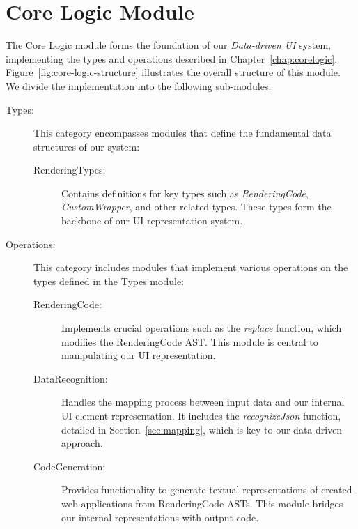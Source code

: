 \section{Core Logic Module}
The Core Logic module forms the foundation of our \emph{Data-driven UI} system, implementing the types and operations described in Chapter~\ref{chap:corelogic}.
Figure~\ref{fig:core-logic-structure} illustrates the overall structure of this module.
We divide the implementation into the following sub-modules:
\begin{description}
	\item[Types:] This category encompasses modules that define the fundamental data structures of our system:
	      \begin{description}
		      \item[RenderingTypes:] Contains definitions for key types such as \emph{RenderingCode}, \emph{CustomWrapper}, and other related types.
		            These types form the backbone of our UI representation system.
	      \end{description}

	\item[Operations:] This category includes modules that implement various operations on the types defined in the Types module:
	      \begin{description}
		      \item[RenderingCode:] Implements crucial operations such as the \emph{replace} function, which modifies the RenderingCode AST.
		            This module is central to manipulating our UI representation.

		      \item[DataRecognition:] Handles the mapping process between input data and our internal UI element representation.
		            It includes the \emph{recognizeJson} function, detailed in Section~\ref{sec:mapping}, which is key to our data-driven approach.

		      \item[CodeGeneration:] Provides functionality to generate textual representations of created web applications from RenderingCode ASTs.
		            This module bridges our internal representations with output code.
	      \end{description}
\end{description}


